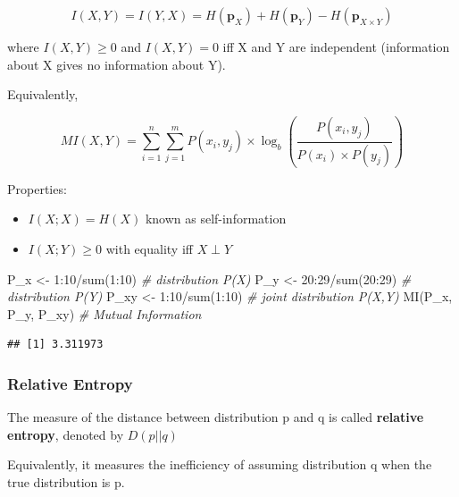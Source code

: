 \documentclass[
]{book}
\newenvironment{Shaded}{\begin{snugshade}}{\end{snugshade}}
\newcommand{\CommentTok}[1]{\textcolor[rgb]{0.56,0.35,0.01}{\textit{#1}}}
\newcommand{\DecValTok}[1]{\textcolor[rgb]{0.00,0.00,0.81}{#1}}
\newcommand{\FunctionTok}[1]{\textcolor[rgb]{0.00,0.00,0.00}{#1}}
\newcommand{\NormalTok}[1]{#1}
\newcommand{\OtherTok}[1]{\textcolor[rgb]{0.56,0.35,0.01}{#1}}
\newcommand{\SpecialCharTok}[1]{\textcolor[rgb]{0.00,0.00,0.00}{#1}}
\providecommand{\tightlist}{%
  \setlength{\itemsep}{0pt}\setlength{\parskip}{0pt}}
\begin{document}
\[
I(X,Y) = I(Y,X) = H(\mathbf{p}_X)+ H(\mathbf{p}_Y)- H(\mathbf{p}_{X \times Y})
\]

where \(I(X,Y) \ge 0\) and \(I(X,Y) = 0\) iff X and Y are independent (information about X gives no information about Y).

Equivalently,

\[
MI(X,Y) = \sum_{i=1}^n \sum_{j=1}^m P(x_i, y_j) \times \log_b (\frac{P(x_i,y_j)}{P(x_i) \times P(y_j)})
\]

Properties:

\begin{itemize}
\tightlist
\item
  \(I(X;X) = H(X)\) known as self-information
\item
  \(I(X;Y) \ge 0\) with equality iff \(X \perp Y\)
\end{itemize}

\begin{Shaded}
\begin{Highlighting}[]
\NormalTok{P\_x }\OtherTok{\textless{}{-}} \DecValTok{1}\SpecialCharTok{:}\DecValTok{10}\SpecialCharTok{/}\FunctionTok{sum}\NormalTok{(}\DecValTok{1}\SpecialCharTok{:}\DecValTok{10}\NormalTok{) }\CommentTok{\# distribution P(X)}
\NormalTok{P\_y }\OtherTok{\textless{}{-}} \DecValTok{20}\SpecialCharTok{:}\DecValTok{29}\SpecialCharTok{/}\FunctionTok{sum}\NormalTok{(}\DecValTok{20}\SpecialCharTok{:}\DecValTok{29}\NormalTok{) }\CommentTok{\# distribution P(Y)}
\NormalTok{P\_xy }\OtherTok{\textless{}{-}} \DecValTok{1}\SpecialCharTok{:}\DecValTok{10}\SpecialCharTok{/}\FunctionTok{sum}\NormalTok{(}\DecValTok{1}\SpecialCharTok{:}\DecValTok{10}\NormalTok{) }\CommentTok{\# joint distribution P(X,Y)}
\FunctionTok{MI}\NormalTok{(P\_x, P\_y, P\_xy) }\CommentTok{\# Mutual Information}
\end{Highlighting}
\end{Shaded}

\begin{verbatim}
## [1] 3.311973
\end{verbatim}

\hypertarget{relative-entropy}{%
\subsubsection{Relative Entropy}\label{relative-entropy}}

The measure of the distance between distribution p and q is called \textbf{relative entropy}, denoted by \(D(p ||q)\)

Equivalently, it measures the inefficiency of assuming distribution q when the true distribution is p.
\end{document}
